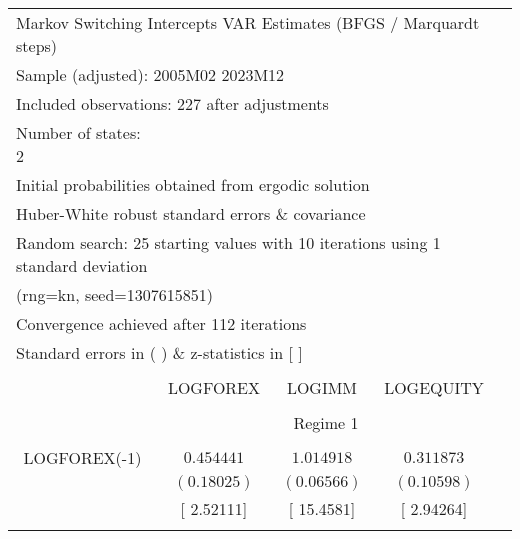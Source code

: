 \begin{tabular}{lrrrr}
\multicolumn{5}{l}{Markov Switching Intercepts VAR Estimates (BFGS / Marquardt steps)}\\
\multicolumn{3}{l}{Sample (adjusted): 2005M02 2023M12}&\multicolumn{1}{c}{}&\multicolumn{1}{c}{}\\
\multicolumn{3}{l}{Included observations: 227 after adjustments}&\multicolumn{1}{c}{}&\multicolumn{1}{c}{}\\
\multicolumn{1}{l}{Number of states: 2}&\multicolumn{1}{c}{}&\multicolumn{1}{c}{}&\multicolumn{1}{c}{}&\multicolumn{1}{c}{}\\
\multicolumn{4}{l}{Initial probabilities obtained from ergodic solution}&\multicolumn{1}{c}{}\\
\multicolumn{4}{l}{Huber-White robust standard errors \& covariance}&\multicolumn{1}{c}{}\\
\multicolumn{6}{l}{Random search: 25 starting values with 10 iterations using 1 standard deviation}\\
\multicolumn{2}{l}{(rng=kn, seed=1307615851)}&\multicolumn{1}{c}{}&\multicolumn{1}{c}{}&\multicolumn{1}{c}{}\\
\multicolumn{3}{l}{Convergence achieved after 112 iterations}&\multicolumn{1}{c}{}&\multicolumn{1}{c}{}\\
\multicolumn{3}{l}{Standard errors in ( ) \& z-statistics in [ ]}&\multicolumn{1}{c}{}&\multicolumn{1}{c}{}\\
[4.5pt] \hline \\ [-4.5pt]
\multicolumn{1}{c}{}&\multicolumn{1}{c}{LOGFOREX}&\multicolumn{1}{c}{LOGIMM}&\multicolumn{1}{c}{LOGEQUITY}&\multicolumn{1}{c}{}\\
[4.5pt] \hline \\ [-4.5pt]
\multicolumn{1}{c}{}&\multicolumn{3}{c}{Regime 1}&\multicolumn{1}{c}{}\\
[4.5pt] \hline \\ [-4.5pt]
\multicolumn{1}{c}{LOGFOREX(-1)}&\multicolumn{1}{c}{$0.454441$}&\multicolumn{1}{c}{$1.014918$}&\multicolumn{1}{c}{$0.311873$}&\multicolumn{1}{c}{}\\
\multicolumn{1}{c}{}&\multicolumn{1}{c}{$(0.18025)$}&\multicolumn{1}{c}{$(0.06566)$}&\multicolumn{1}{c}{$(0.10598)$}&\multicolumn{1}{c}{}\\
\multicolumn{1}{c}{}&\multicolumn{1}{c}{[ 2.52111]}&\multicolumn{1}{c}{[ 15.4581]}&\multicolumn{1}{c}{[ 2.94264]}&\multicolumn{1}{c}{}\\
\multicolumn{1}{c}{}&\multicolumn{1}{c}{}&\multicolumn{1}{c}{}&\multicolumn{1}{c}{}&\multicolumn{1}{c}{}\\

\end{tabular}
